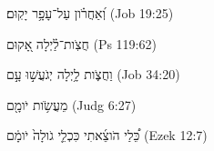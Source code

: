 
\begin{exe}

\ex\label{simassorted_exs1}
\texthebrew{
וְ֝אַחֲרֹ֗ון עַל־עָפָ֥ר יָקֽוּם׃ 
} (Job 19:25)

\ex\label{simassorted_exs2}
\texthebrew{
חֲצֹֽות־לַ֗יְלָה אָ֭קוּם 
} (Ps 119:62)

\ex\label{simassorted_exs3}
\texthebrew{
וַחֲצֹ֪ות לָ֥יְלָה יְגֹעֲשׁ֣וּ עָ֣ם 
} (Job 34:20)

\ex\label{simassorted_exs4}
\texthebrew{
מֵעֲשֹׂ֥ות יֹומָ֖ם 
} (Judg 6:27)

\ex\label{simassorted_exs5}
\texthebrew{
כֵּ֠לַי הֹוצֵ֜אתִי כִּכְלֵ֤י גֹולָה֙ יֹומָ֔ם 
} (Ezek 12:7)

\end{exe}

